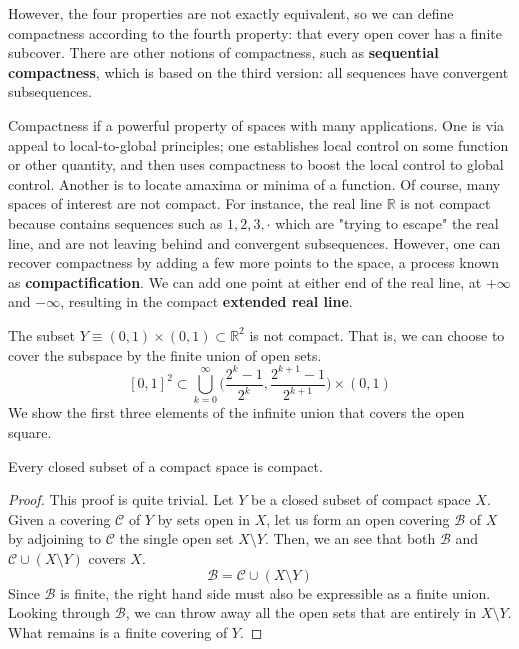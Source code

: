 \documentclass{article}
\begin{document}
    However, the four properties are not exactly equivalent, so we can define compactness according to the fourth property: that every open cover has a finite subcover. There are other notions of compactness, such as \textbf{sequential compactness}, which is based on the third version: all sequences have convergent subsequences. 

    Compactness if a powerful property of spaces with many applications. One is via appeal to local-to-global principles; one establishes local control on some function or other quantity, and then uses compactness to boost the local control to global control. Another is to locate amaxima or minima of a function. Of course, many spaces of interest are not compact. For instance, the real line $\mathbb{R}$ is not compact because contains sequences such as $1, 2, 3, \cdot$ which are "trying to escape" the real line, and are not leaving behind and convergent subsequences. However, one can recover compactness by adding a few more points to the space, a process known as \textbf{compactification}. We can add one point at either end of the real line, at $+\infty$ and $-\infty$, resulting in the compact \textbf{extended real line}. 


    \begin{example}
    The subset $Y \equiv (0,1) \times (0,1) \subset \mathbb{R}^2$ is not compact. That is, we can choose to cover the subspace by the finite union of open sets. 
    \[[0,1]^2 \subset \bigcup_{k=0}^\infty \Big( \frac{2^k - 1}{2^k}, \frac{2^{k+1} - 1}{2^{k+1}} \Big) \times (0,1)\]
    We show the first three elements of the infinite union that covers the open square.  
    \begin{center}
    \end{center}
    \end{example}

    \begin{theorem}
    Every closed subset of a compact space is compact. 
    \end{theorem}
    \begin{proof}
    This proof is quite trivial. Let $Y$ be a closed subset of compact space $X$. Given a covering $\mathcal{C}$ of $Y$ by sets open in $X$, let us form an open covering $\mathscr{B}$ of $X$ by adjoining to $\mathcal{C}$ the single open set $X \setminus Y$. Then, we an see that both $\mathscr{B}$ and $\mathcal{C} \cup (X \setminus Y)$ covers $X$. 
    \[\mathscr{B} = \mathcal{C} \cup (X \setminus Y)\]
    Since $\mathscr{B}$ is finite, the right hand side must also be expressible as a finite union. Looking through $\mathscr{B}$, we can throw away all the open sets that are entirely in $X \setminus Y$. What remains is a finite covering of $Y$. 
    \end{proof}
\end{document}
